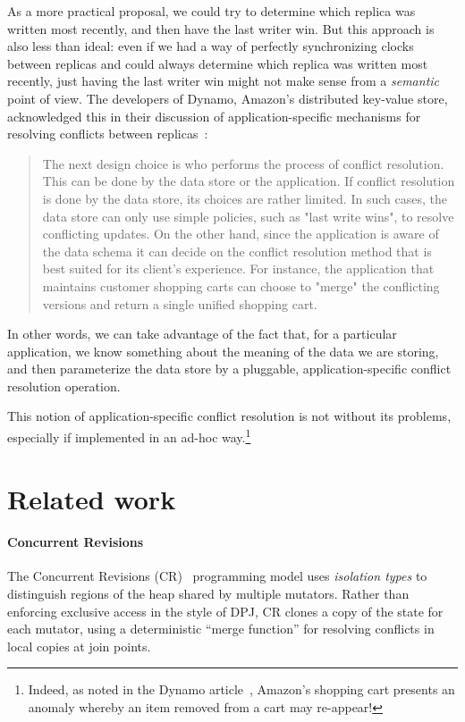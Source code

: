 \documentclass{article}
\begin{document}
As a more practical proposal, we could try to determine which replica
was written most recently, and then have the last writer win.  But
this approach is also less than ideal: even if we had a way of
perfectly synchronizing clocks between replicas and could always
determine which replica was written most recently, just having the
last writer win might not make sense from a \emph{semantic} point of
view.  The developers of Dynamo, Amazon's distributed key-value store,
acknowledged this in their discussion of application-specific
mechanisms for resolving conflicts between replicas~\cite{dynamo}:
\begin{quote}
  The next design choice is who performs the process of conflict
  resolution. This can be done by the data store or the
  application. If conflict resolution is done by the data store, its
  choices are rather limited. In such cases, the data store can only
  use simple policies, such as "last write wins", to resolve
  conflicting updates. On the other hand, since the application is
  aware of the data schema it can decide on the conflict resolution
  method that is best suited for its client’s experience. For
  instance, the application that maintains customer shopping carts can
  choose to "merge" the conflicting versions and return a single
  unified shopping cart.
\end{quote}
In other words, we can take advantage of the fact that, for a
particular application, we know something about the meaning of the
data we are storing, and then parameterize the data store by a
pluggable, application-specific conflict resolution operation.

This notion of application-specific conflict resolution is not without
its problems, especially if implemented in an ad-hoc
way.\footnote{Indeed, as noted in the Dynamo article~\cite{dynamo},
  Amazon's shopping cart presents an anomaly whereby an item removed
  from a cart may re-appear!}


\section{Related work}

\paragraph{Concurrent Revisions}

The Concurrent Revisions (CR)~\cite{concurrent-revisions-haskell11}
programming model uses \emph{isolation types} \cite{isolation-types}
to distinguish regions of the heap shared by multiple mutators.
Rather than enforcing exclusive access in the style of DPJ, CR clones
a copy of the state for each mutator, using a deterministic ``merge
function'' for resolving conflicts in local copies at join points.
\end{document}
